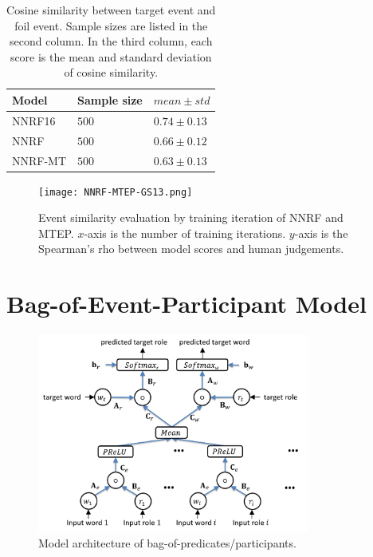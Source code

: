 \documentclass[a4paper]{article}
\begin{document}
\begin{table}[t]
\centering
\begin{tabular}{lll}
    \textbf{Model}  &  Sample size  & $mean \pm std$\\ \hline
    NNRF16        &  $500$  & $0.74\pm 0.13$  \\
    NNRF        &  $500$  & $0.66\pm 0.12$  \\
    NNRF-MT       &  $500$  & $0.63\pm 0.13$  \\
\end{tabular}
\caption{\label{tab:foil-mtep} Cosine similarity between target event and foil event. Sample sizes are listed in the second column. In the third column, each score is the mean and standard deviation of cosine similarity. }
\end{table}
% 
% 
% 
%


\begin{figure}[t]
\centering
\texttt{[image: NNRF-MTEP-GS13.png]}
\caption{\label{fig:NNRF-MTEP-GS13} Event similarity evaluation by training iteration of NNRF and MTEP. $x$-axis is the number of training iterations. $y$-axis is the Spearman's rho between model scores and human judgements. }
\end{figure}



\section{Bag-of-Event-Participant Model} \label{sec:bop}


\begin{figure}[t]
\centering
\includegraphics[width=0.8\textwidth]{BOP.png}
\caption{\label{fig:BOP} Model architecture of bag-of-predicates/participants.}
\end{figure}
\end{document}
